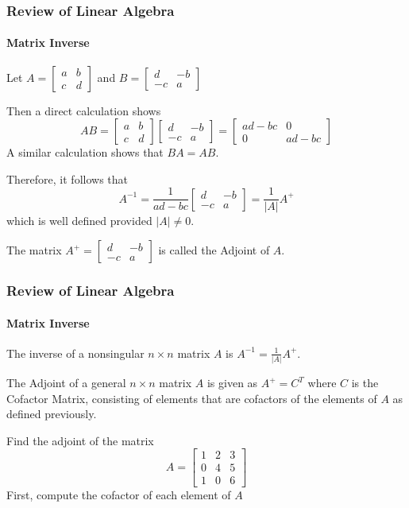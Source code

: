 \begin{frame}
\frametitle{Review of Linear Algebra}
\framesubtitle{Matrix Inverse}

Let $A=\left[\begin{array}{cc} a & b \\ c & d \end{array}\right]$ and $B = \left[\begin{array}{rr} d & -b \\ -c & a\end{array}\right]$

Then a direct calculation shows
$$
AB =\left[\begin{array}{cc} a & b \\ c & d \end{array}\right] \left[\begin{array}{rr} d & -b \\ -c & a\end{array}\right]
= \left[\begin{array}{cc} ad-bc & 0 \\ 0 & ad-bc \end{array}\right]
$$
A similar calculation shows that $BA = AB$.

Therefore, it follows that
$$
A^{-1} = \frac{1}{ad-bc} \left[\begin{array}{rr} d & -b \\ -c & a\end{array}\right] = \frac{1}{|A|}A^+
$$
which is well defined provided $|A|\ne 0$.

The matrix $A^+ = \left[\begin{array}{rr} d & -b \\ -c & a\end{array}\right]$ is called the {\bor Adjoint of $A$}.
\end{frame}
\begin{frame}
\frametitle{Review of Linear Algebra}
\framesubtitle{Matrix Inverse}
The inverse of a nonsingular $n\times n$ matrix $A$ is $A^{-1} = \frac{1}{|A|}A^+$.

The {\bor Adjoint} of a general $n\times n$ matrix $A$ is given as $A^+ = C^T$ where $C$ is the {\bor Cofactor Matrix}, consisting of elements that are cofactors of the elements of $A$ as
defined previously.
\begin{examp}
Find the adjoint of the matrix
$$
A = \left[\begin{array}{ccc}
1 & 2 & 3 \\ 0 & 4 & 5 \\ 1 & 0 & 6 \end{array}\right]
$$
First, compute the cofactor of each element of $A$
\end{examp}
\end{frame}
